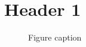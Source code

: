 \documentclass[11pt,a4paper]{article}
\begin{document}
\section{Header 1}
\lipsum[1-2]

\begin{figure}[!h]
\centering
\caption{Figure caption}
\label{figureLabel}
\end{figure}

\lipsum[4-10]
\end{document}
